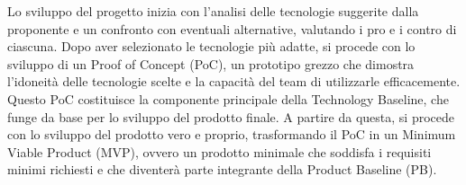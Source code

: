\begin{flushleft}
	Lo sviluppo del progetto inizia con l'analisi delle tecnologie suggerite dalla proponente e un confronto con eventuali alternative, valutando i pro e i contro di ciascuna. Dopo aver selezionato le tecnologie più adatte, si procede con lo sviluppo di un Proof of Concept (PoC), un prototipo grezzo che dimostra l'idoneità delle tecnologie scelte e la capacità del team di utilizzarle efficacemente. Questo PoC costituisce la componente principale della Technology Baseline, che funge da base per lo sviluppo del prodotto finale. A partire da questa, si procede con lo sviluppo del prodotto vero e proprio, trasformando il PoC in un Minimum Viable Product (MVP), ovvero un prodotto minimale che soddisfa i requisiti minimi richiesti e che diventerà parte integrante della Product Baseline (PB).
\end{flushleft}

